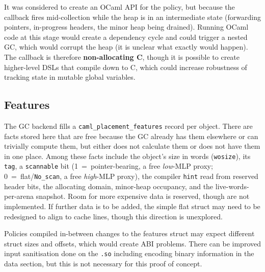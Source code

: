 \documentclass[sigconf]{acmart}
\begin{document}
It was considered to create an OCaml API for the policy, but because the callback fires mid-collection while the heap is in an intermediate state (forwarding pointers, in-progress headers, the minor heap being drained). Running OCaml code at this stage would create a dependency cycle and could trigger a nested GC, which would corrupt the heap (it is unclear what exactly would happen). The callback is therefore \textbf{non-allocating C}, though it is possible to create higher-level DSLs that compile down to C, which could increase robustness of tracking state in mutable global variables.

\subsection{Features}

The GC backend fills a \texttt{caml\_placement\_features} record per object. There are facts stored here that are free because the GC already has them elsewhere or can trivially compute them, but either does not calculate them or does not have them in one place. Among these facts include the object's size in words (\texttt{wosize}), its \texttt{tag}, a \texttt{scannable} bit (1~=~pointer-bearing, a free \emph{low}-MLP proxy; 0~=~flat/\texttt{No\_scan}, a free \emph{high}-MLP proxy), the compiler \texttt{hint} read from reserved header bits, the allocating domain, minor-heap occupancy, and the live-words-per-arena
snapshot. Room for more expensive data is reserved, though are not implemented. If further data is to be added, the simple flat struct may need to be redesigned to align to cache lines, though this direction is unexplored.

Policies compiled in-between changes to the features struct may expect different struct sizes and offsets, which would create ABI problems. There can be improved input sanitisation done on the \texttt{.so} including encoding binary information in the data section, but this is not necessary for this proof of concept.
\end{document}
